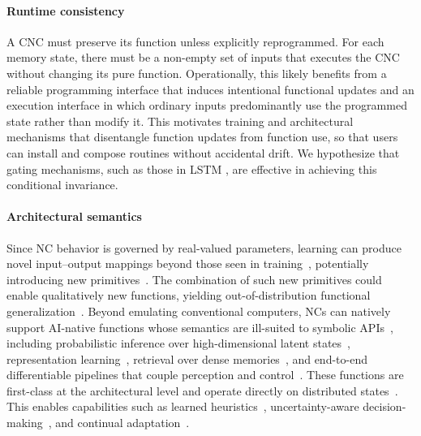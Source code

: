 \paragraph{Runtime consistency}
A CNC must preserve its function unless explicitly reprogrammed. For each memory state, there must be a non-empty set of inputs that executes the CNC without changing its pure function.
Operationally, this likely benefits from a reliable programming interface that induces intentional functional updates and an execution interface in which ordinary inputs predominantly use the programmed state rather than modify it. 
This motivates training and architectural mechanisms that disentangle function updates from function use, so that users can install and compose routines without accidental drift.
We hypothesize that gating mechanisms, such as those in LSTM \citep{hochreiter1997long}, are effective in achieving this conditional invariance.

\paragraph{Architectural semantics}
Since NC behavior is governed by real-valued parameters, learning can produce novel input–output mappings beyond those seen in training~\citep{poggio2019theoretical}, potentially introducing new primitives~\citep{ha2016hypernetworks}.
The combination of such new primitives could enable qualitatively new functions, yielding out-of-distribution functional generalization~\citep{lake2018generalization}.
Beyond emulating conventional computers, NCs can natively support AI-native functions whose semantics are ill-suited to symbolic APIs~\citep{marcus2018deep}, including probabilistic inference over high-dimensional latent states~\citep{kingma2013auto}, representation learning~\citep{bengio2013representation}, retrieval over dense memories~\citep{graves2016hybrid}, and end-to-end differentiable pipelines that couple perception and control~\citep{silver2017mastering}. These functions are first-class at the architectural level and operate directly on distributed states~\citep{lecun2015deep}. This enables capabilities such as learned heuristics~\citep{silver2017mastering}, uncertainty-aware decision-making~\citep{clements2019estimating}, and continual adaptation~\citep{parisi2019continual}.

